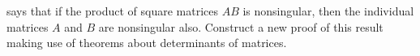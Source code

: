  says that if the product of square matrices $AB$ is nonsingular, then the individual matrices $A$ and $B$ are nonsingular also.  Construct a new proof of this result making use of theorems about determinants of matrices.